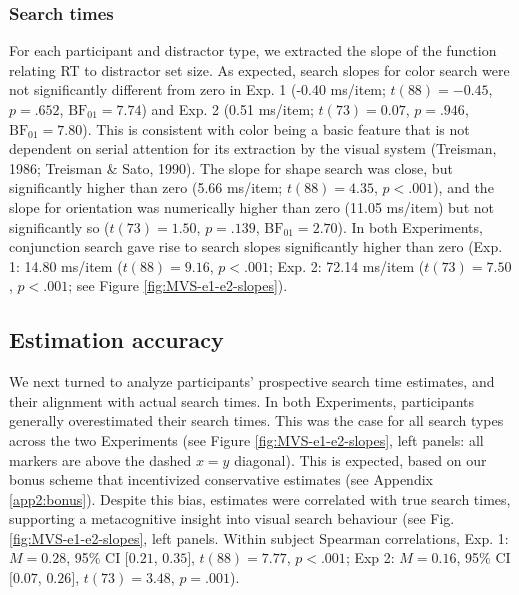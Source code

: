 \documentclass[12pt,twoside]{reedthesis}
\begin{document}
\hypertarget{search-times}{%
\subsubsection*{Search times}\label{search-times}}

For each participant and distractor type, we extracted the slope of the function relating RT to distractor set size. As expected, search slopes for color search were not significantly different from zero in Exp. 1 (-0.40 ms/item; \(t(88) = -0.45\), \(p = .652\), \(\mathrm{BF}_{\textrm{01}} = 7.74\)) and Exp. 2 (0.51 ms/item; \(t(73) = 0.07\), \(p = .946\), \(\mathrm{BF}_{\textrm{01}} = 7.80\)). This is consistent with color being a basic feature that is not dependent on serial attention for its extraction by the visual system (Treisman, 1986; Treisman \& Sato, 1990). The slope for shape search was close, but significantly higher than zero (5.66 ms/item; \(t(88) = 4.35\), \(p < .001\)), and the slope for orientation was numerically higher than zero (11.05 ms/item) but not significantly so (\(t(73) = 1.50\), \(p = .139\), \(\mathrm{BF}_{\textrm{01}} = 2.70\)). In both Experiments, conjunction search gave rise to search slopes significantly higher than zero (Exp. 1: 14.80 ms/item (\(t(88) = 9.16\), \(p < .001\); Exp. 2: 72.14 ms/item (\(t(73) = 7.50\), \(p < .001\); see Figure \ref{fig:MVS-e1-e2-slopes}).

\hypertarget{estimation-accuracy}{%
\subsection*{Estimation accuracy}\label{estimation-accuracy}}

We next turned to analyze participants' prospective search time estimates, and their alignment with actual search times. In both Experiments, participants generally overestimated their search times. This was the case for all search types across the two Experiments (see Figure \ref{fig:MVS-e1-e2-slopes}, left panels: all markers are above the dashed \(x=y\) diagonal). This is expected, based on our bonus scheme that incentivized conservative estimates (see Appendix \ref{app2:bonus}). Despite this bias, estimates were correlated with true search times, supporting a metacognitive insight into visual search behaviour (see Fig. \ref{fig:MVS-e1-e2-slopes}, left panels. Within subject Spearman correlations, Exp. 1: \(M = 0.28\), 95\% CI \([0.21\), \(0.35]\), \(t(88) = 7.77\), \(p < .001\); Exp 2: \(M = 0.16\), 95\% CI \([0.07\), \(0.26]\), \(t(73) = 3.48\), \(p = .001\)).
\end{document}
